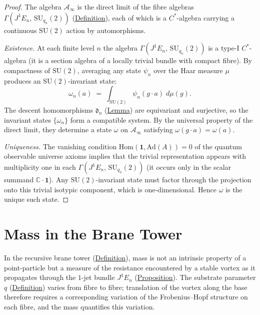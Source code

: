 \begin{proof}
The algebra $\mathcal{A}_\infty$ is the direct limit of the fibre algebras
$\Gamma(J^1 E_n,\, \mathrm{SU}_{q_n}(2))$
(\hyperref[def:direct-limit-algebra]{Definition}), each of which is a
$C^*$-algebra carrying a continuous $\mathrm{SU}(2)$ action by automorphisms.

\emph{Existence.}
At each finite level $n$ the algebra
$\Gamma(J^1 E_n,\, \mathrm{SU}_{q_n}(2))$ is a type-I $C^*$-algebra
(it is a section algebra of a locally trivial bundle with compact fibre).
By compactness of $\mathrm{SU}(2)$, averaging any state $\psi_n$ over the
Haar measure $\mu$ produces an $\mathrm{SU}(2)$-invariant state:
\[
\omega_n(a)
  \;=\;
  \int_{\mathrm{SU}(2)} \psi_n(g \cdot a)\; d\mu(g).
\]
The descent homomorphisms $\mathfrak{d}_n$ (\hyperref[lem:descent]{Lemma}) are
equivariant and surjective, so the invariant states $\{\omega_n\}$ form a
compatible system.  By the universal property of the direct limit, they
determine a state $\omega$ on $\mathcal{A}_\infty$ satisfying
$\omega(g \cdot a) = \omega(a)$.

\emph{Uniqueness.}
The vanishing condition
$\mathrm{Hom}(\mathbf{1}, \mathrm{Ad}(A)) = 0$ of the quantum observable
universe axioms implies that the trivial representation appears with
multiplicity one in each $\Gamma(J^1 E_n,\, \mathrm{SU}_{q_n}(2))$ (it
occurs only in the scalar summand $\mathbb{C} \cdot \mathbf{1}$).  Any
$\mathrm{SU}(2)$-invariant state must factor through the projection onto
this trivial isotypic component, which is one-dimensional.  Hence
$\omega$ is the unique such state.
\end{proof}

\section{Mass in the Brane Tower}
\label{sec:mass-brane}

\begin{remark}
  \label{rem:mass-geometric-drag}
In the recursive brane tower (\hyperref[def:recursive-brane-tower]{Definition}),
mass is not an intrinsic property of a point-particle but a measure of the
resistance encountered by a stable vortex as it propagates through the
$1$-jet bundle $J^1 E_n$ (\hyperref[prop:jet-prolongation]{Proposition}).  The
substrate parameter $q$ (\hyperref[def:substrate-parameter]{Definition}) varies from
fibre to fibre; translation of the vortex along the base therefore requires a
corresponding variation of the Frobenius--Hopf structure on each fibre, and
the mass quantifies this variation.
\end{remark}

